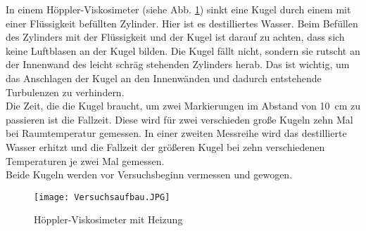 In einem Höppler-Viskosimeter (siehe Abb. \ref{fig:aufbau}) sinkt eine Kugel durch einem mit einer Flüssigkeit befüllten Zylinder. Hier ist es destilliertes Wasser. Beim Befüllen des Zylinders mit der Flüssigkeit und der Kugel ist darauf zu achten, dass sich keine Luftblasen an der Kugel bilden. Die Kugel fällt nicht, sondern sie rutscht an der Innenwand des leicht schräg stehenden  Zylinders herab. Das ist wichtig, um das Anschlagen der Kugel an den Innenwänden und dadurch entstehende Turbulenzen zu verhindern. \\
Die Zeit, die die Kugel braucht, um zwei Markierungen im Abstand von \SI{10}{\centi\meter} zu passieren ist die Fallzeit. Diese wird für zwei verschieden große Kugeln zehn Mal bei Raumtemperatur gemessen. 
In einer zweiten Messreihe wird das destillierte Wasser erhitzt und die Fallzeit der größeren Kugel bei zehn verschiedenen Temperaturen je zwei Mal gemessen. \\
Beide Kugeln werden vor Versuchsbeginn vermessen und gewogen. \\

\begin{figure}[h!]
	\centering
	\texttt{[image: Versuchsaufbau.JPG]}
	\caption{Höppler-Viskosimeter mit Heizung}
	\label{fig:aufbau}
\end{figure}

 